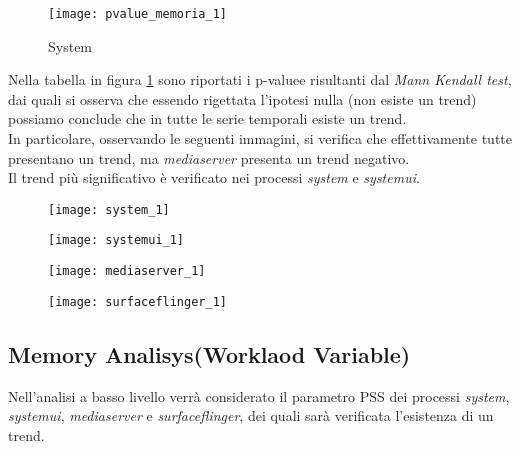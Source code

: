 \begin{figure}[!htbp]
  \centering
  \texttt{[image: pvalue\_memoria\_1]}
  \caption{System}
  \label{pvalue_memoria_1}
\end{figure}

Nella tabella in figura \ref{pvalue_memoria_1} sono riportati i p-valuee risultanti
dal \textit{Mann Kendall test}, dai quali si osserva che essendo rigettata l'ipotesi
nulla (non esiste un trend) possiamo conclude che in tutte le serie temporali
esiste un trend.\\
In particolare, osservando le seguenti immagini, si verifica che effettivamente
tutte presentano un trend, ma \textit{mediaserver} presenta un trend negativo.\\
Il trend più significativo è verificato nei processi \textit{system} e \textit{systemui}.

\begin{minipage}{\linewidth}
  \centering
  \begin{minipage}{0.49\linewidth}
    \begin{figure}[H]
      \texttt{[image: system\_1]}
    \end{figure}
  \end{minipage}
  \begin{minipage}{0.49\linewidth}
    \begin{figure}[H]
      \texttt{[image: systemui\_1]}
    \end{figure}
  \end{minipage}
  \begin{minipage}{0.49\linewidth}
    \begin{figure}[H]
      \texttt{[image: mediaserver\_1]}
    \end{figure}
  \end{minipage}
  \begin{minipage}{0.49\linewidth}
    \begin{figure}[H]
      \texttt{[image: surfaceflinger\_1]}
    \end{figure}
  \end{minipage}
\end{minipage}

\clearpage
\subsection{Memory Analisys(Worklaod Variable)}

Nell'analisi a basso livello verrà considerato il parametro PSS dei processi \textit{system},
\textit{systemui}, \textit{mediaserver} e \textit{surfaceflinger}, dei quali
sarà verificata l'esistenza di un trend.\\

